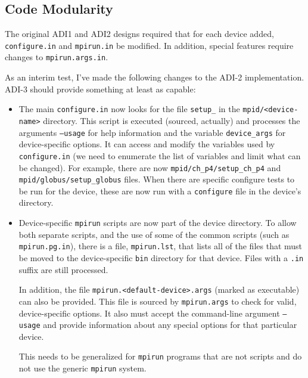 \documentclass{article}
\let\file=\texttt
\let\code=\texttt
\begin{document}
\subsection{Code Modularity}
The original ADI1 and ADI2 designs required that for each device added, 
\file{configure.in} and \file{mpirun.in} be modified.  In addition, special
features require changes to \file{mpirun.args.in}.  

As an interim test, I've made the following changes to the ADI-2
implementation.  ADI-3 should provide something at least as capable:
\begin{itemize}
\item The main \file{configure.in} now looks for the file
  \file{setup\_<device-name>} in the \file{mpid/<device-name>} directory.
  This script is executed (sourced, actually) and processes the arguments
  \texttt{--usage} for   help information and the variable
  \texttt{device\_args} for device-specific options.  It can access and modify
  the variables used by \file{configure.in} (we need to enumerate the list of
  variables and limit what can be changed).  For example, there are now
  \file{mpid/ch\_p4/setup\_ch\_p4} and \file{mpid/globus/setup\_globus} files.
  When there are specific configure tests to be run for the device, these are
  now run with a \file{configure} file in the device's directory.

\item Device-specific \file{mpirun} scripts are now part of the device
  directory.  To allow both separate scripts, and the use of some of the
  common scripts (such as \file{mpirun.pg.in}), there is a file,
  \file{mpirun.lst}, that lists all of the files that must be moved to the
  device-specific \file{bin} directory for that device.  Files with a
  \file{.in} suffix are still processed.

  In addition, the file \file{mpirun.<default-device>.args} (marked as 
  executable) can also be provided.  This file is sourced by
  \file{mpirun.args} to check for valid, device-specific options.  It also
  must accept the command-line argument \texttt{--usage} and provide 
  information about any special options for that particular device.

  This needs to be generalized for \code{mpirun} programs that are not scripts
  and do not use the generic \code{mpirun} system.
\end{itemize}
\end{document}
